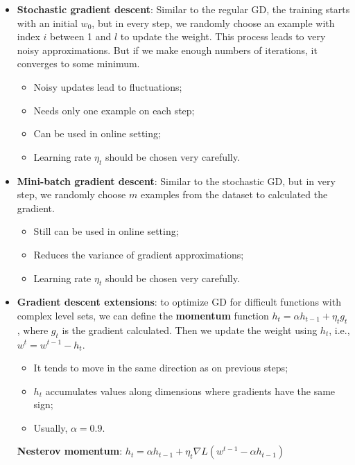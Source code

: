 \documentclass[]{article}
\begin{document}
\begin{itemize}
\begin{itemize}
		\item \textbf{Stochastic gradient descent}: Similar to the regular GD, the training starts with an initial $w_0$, but in every step, we randomly choose an example with index $i$ between 1 and $l$ to update the weight. This process leads to very noisy approximations. But if we make enough numbers of iterations, it converges to some minimum.
		\begin{itemize}
			\item Noisy updates lead to fluctuations;
			\item Needs only one example on each step;
			\item Can be used in online setting;
			\item Learning rate $\eta_t$ should be chosen very carefully.
		\end{itemize}
		
		\item \textbf{Mini-batch gradient descent}: Similar to the stochastic GD, but in very step, we randomly choose $m$ examples from the dataset to calculated the gradient.
		\begin{itemize}
			\item Still can be used in online setting;
			\item Reduces the variance of gradient approximations;
			\item Learning rate $\eta_t$ should be chosen very carefully.
		\end{itemize}
		
		\item \textbf{Gradient descent extensions}: to optimize GD for difficult functions with complex level sets, we can define the \textbf{momentum} function $h_t=\alpha h_{t-1}+\eta_tg_t$, where $g_t$ is the gradient calculated. Then we update the weight using $h_t$, i.e., $w^t=w^{t-1}-h_t$. 
		\begin{itemize}
			\item It tends to move in the same direction as on previous steps;
			\item $h_t$ accumulates values along dimensions where gradients have the same sign;
			\item Usually, $\alpha=0.9$.
		\end{itemize}
		\textbf{Nesterov momentum}: $h_t=\alpha h_{t-1} + \eta_t \nabla L(w^{t-1}-\alpha h_{t-1})$
		

\end{itemize}
\end{itemize}
\end{document}
